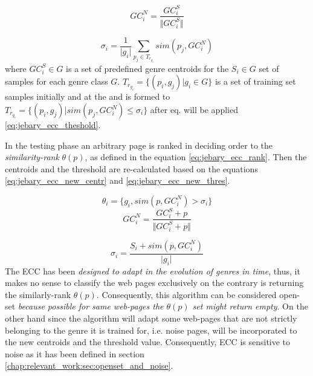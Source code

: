 \begin{equation}\label{eq:jebary_ecc_centroids}
	GC_{i}^{N} = \frac{GC^{S}_{i}}{\Vert GC^{S}_{i}\Vert }
\end{equation}

\begin{equation}\label{eq:jebary_ecc_theshold}
	\sigma_{i} = \frac{1}{\vert g_{i} \vert } \sum_{p_{j} \in T_{r_{g_{i}}}} sim(p_{j}, GC_{i}^{N})
\end{equation}
\noindent
where $GC^{S}_{i} \in G$ is a set of predefined genre centroids for the $S_{i} \in G$ set of samples for each genre class $G$. $T_{r_{g_{i}}} =   \{ (p_{i}, g_{j}) \vert g_{i} \in G  \}$ is a set of training set samples initially and at the and is formed to $T_{r_{g_{i}}} =   \{ (p_{i}, g_{j}) \vert sim(p_{j}, GC^{N}_{i}) \leq \sigma_{i} \}$  after eq. will be applied \ref{eq:jebary_ecc_theshold}.

In the testing phase an arbitrary page is ranked in deciding order to the \textit{similarity-rank} $\theta(p)$, as defined in the equation \ref{eq:jebary_ecc_rank}. Then the centroids and the threshold are re-calculated based on the equations \ref{eq:jebary_ecc_new_centr} and \ref{eq:jebary_ecc_new_thres}. 

\begin{equation}\label{eq:jebary_ecc_rank}
	\theta_{i} = \{g_{i}, sim(p, GC_{i}^{N}) > \sigma_{i}\}
\end{equation}
\begin{equation}\label{eq:jebary_ecc_new_centr}
	GC_{i}^{N} =  \frac{GC^{S}_{i} + p}{\Vert GC^{S}_{i}  + p\Vert}
\end{equation}

\begin{equation}\label{eq:jebary_ecc_new_thres}
	\sigma_{i} = \frac{S_{i} +  sim(p, GC_{i}^{N})}{\vert g_{i} \vert}
\end{equation}
The ECC has been \textit{designed to adapt in the evolution of genres in time}, thus, it makes no sense to classify the web pages exclusively on the contrary is returning the similarly-rank $\theta(p)$. Consequently, this algorithm can be considered open-set \textit{because possible for same web-pages the  $\theta(p)$ set might return empty}. On the other hand since the algorithm will adapt some web-pages that are not strictly belonging to the genre it is trained for, i.e. noise pages, will be incorporated to the new centroids and the threshold value.  Consequently, ECC is sensitive to noise as it has been defined in section \ref{chap:relevant_work:sec:openset_and_noise}.


